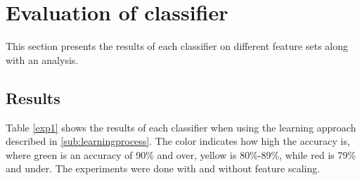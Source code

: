\documentclass[USenglish]{ifimaster}  %
\begin{document}
 
\section{Evaluation of classifier}\label{result_exp1}
	This section presents the results of each classifier on different feature sets along with an analysis.
	
\subsection{Results}
Table \ref{exp1} shows the results of each classifier when using the learning approach described in \ref{sub:learningprocess}. The color indicates how high the accuracy is, where green is an accuracy of 90\% and over, yellow is 80\%-89\%, while red is 79\% and under. The experiments were done with and without feature scaling.  
\end{document}
